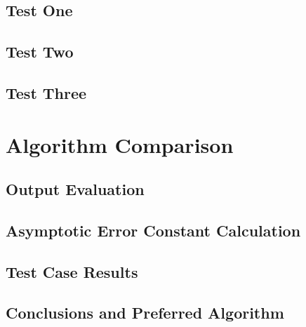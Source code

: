 \documentclass[11pt]{article} %
\begin{document}
\subsection*{Test One}


\subsection*{Test Two}


\subsection*{Test Three}


\section*{Algorithm Comparison}

\subsection*{Output Evaluation}

\subsection*{Asymptotic Error Constant Calculation}

\subsection*{Test Case Results}

\subsection*{Conclusions and Preferred Algorithm}
 
\end{document}
